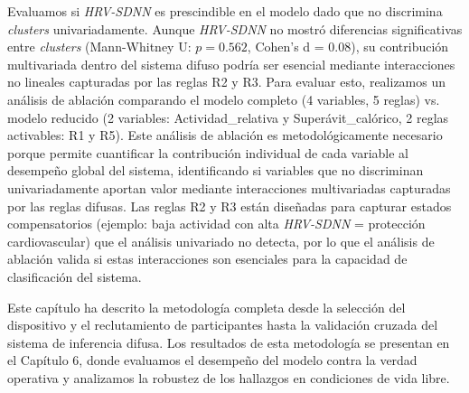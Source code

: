 Evaluamos si \textit{HRV-SDNN} es prescindible en el modelo dado que no discrimina \textit{clusters} univariadamente. Aunque \textit{HRV-SDNN} no mostró diferencias significativas entre \textit{clusters} (Mann-Whitney U: $p = 0.562$, Cohen's d = 0.08), su contribución multivariada dentro del sistema difuso podría ser esencial mediante interacciones no lineales capturadas por las reglas R2 y R3. Para evaluar esto, realizamos un análisis de ablación comparando el modelo completo (4 variables, 5 reglas) vs. modelo reducido (2 variables: Actividad\_relativa y Superávit\_calórico, 2 reglas activables: R1 y R5). Este análisis de ablación es metodológicamente necesario porque permite cuantificar la contribución individual de cada variable al desempeño global del sistema, identificando si variables que no discriminan univariadamente aportan valor mediante interacciones multivariadas capturadas por las reglas difusas. Las reglas R2 y R3 están diseñadas para capturar estados compensatorios (ejemplo: baja actividad con alta \textit{HRV-SDNN} = protección cardiovascular) que el análisis univariado no detecta, por lo que el análisis de ablación valida si estas interacciones son esenciales para la capacidad de clasificación del sistema.

Este capítulo ha descrito la metodología completa desde la selección del dispositivo y el reclutamiento de participantes hasta la validación cruzada del sistema de inferencia difusa. Los resultados de esta metodología se presentan en el Capítulo 6, donde evaluamos el desempeño del modelo contra la verdad operativa y analizamos la robustez de los hallazgos en condiciones de vida libre.